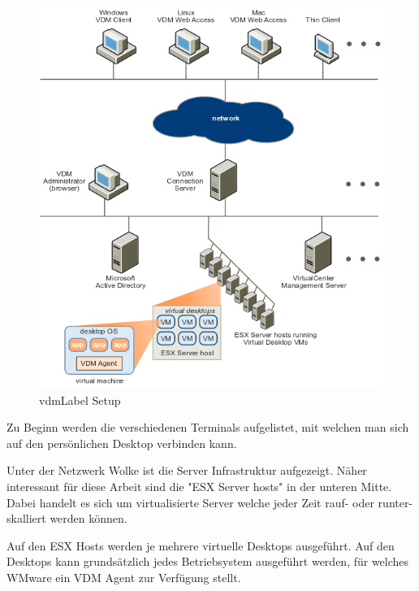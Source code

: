 \begin{figure}[H]
	\includegraphics[width=\textwidth]{images/vmware-vdm-setup}
	\caption{\Gls{vdmLabel} Setup}
	\label{fig:vdmSetup}
\end{figure}


Zu Beginn werden die verschiedenen Terminals aufgelistet, mit welchen man sich auf den persönlichen Desktop verbinden kann. 

Unter der Netzwerk Wolke ist die Server Infrastruktur aufgezeigt.
Näher interessant für diese Arbeit sind die "ESX Server hosts" in der unteren Mitte. Dabei handelt es sich um virtualisierte Server welche jeder Zeit rauf- oder runter-skalliert werden können. 

Auf den ESX Hosts werden je mehrere virtuelle Desktops ausgeführt. 
Auf den Desktops kann grundsätzlich jedes Betriebsystem ausgeführt werden, für welches WMware ein VDM Agent zur Verfügung stellt.



